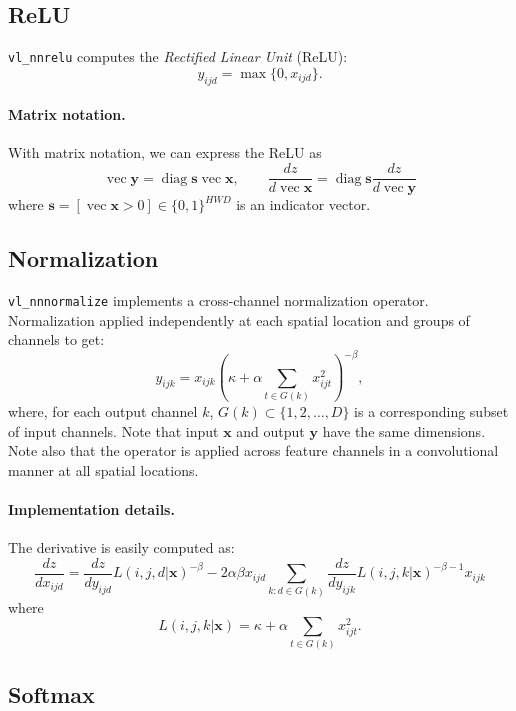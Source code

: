 \documentclass[12pt]{article}
\newcommand{\vv}{\operatorname{vec}}
\newcommand{\diag}{\operatorname{diag}}
\newcommand{\bx}{\mathbf{x}}
\newcommand{\by}{\mathbf{y}}
\newcommand{\bs}{\mathbf{s}}
\begin{document}
\subsection{ReLU}\label{s:relu}

\verb!vl_nnrelu! computes the \emph{Rectified Linear Unit} (ReLU):
\[
 y_{ijd} = \max\{0, x_{ijd}\}.
\]

\paragraph{Matrix notation.} With matrix notation, we can express the ReLU as
\[
\boxed{
\vv\by = \diag\bs \vv \bx,
\qquad
\frac{d z}{d \vv \bx}
=
\diag\bs
\frac{d z}{d \vv \by}
}
\]
where $\bs = [\vv \bx > 0] \in\{0,1\}^{HWD}$ is an indicator vector.

\subsection{Normalization}\label{s:normalization}

\verb!vl_nnnormalize! implements a cross-channel normalization operator. Normalization applied independently at each spatial location and groups of channels to get:
\[
 y_{ijk} = x_{ijk} \left( \kappa + \alpha \sum_{t\in G(k)} x_{ijt}^2 \right)^{-\beta},
\]
where, for each output channel $k$, $G(k) \subset \{1, 2, \dots, D\}$ is a corresponding subset of input channels. Note that input $\bx$ and output $\by$ have the same dimensions. Note also that the operator is applied across feature channels in a convolutional manner at all spatial locations.

\paragraph{Implementation details.} The derivative is easily computed as:
\[
\frac{dz}{d x_{ijd}}
=
\frac{dz}{d y_{ijd}}
L(i,j,d|\bx)^{-\beta}
-2\alpha\beta x_{ijd}
\sum_{k:d\in G(k)}
\frac{dz}{d y_{ijk}}
L(i,j,k|\bx)^{-\beta-1} x_{ijk} 
\]
where
\[
 L(i,j,k|\bx) = \kappa + \alpha \sum_{t\in G(k)} x_{ijt}^2.
\]

\subsection{Softmax}\label{s:softmax}
\end{document}

